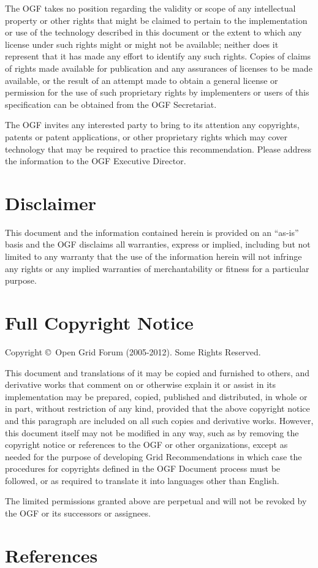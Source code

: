 \documentclass{article}
\newcommand{\copyrightyears}{2005-2012}
\begin{document}
The OGF takes no position regarding the validity or scope of any intellectual property or other rights that might be claimed to pertain to the implementation or use of the technology described in this document or the extent to which any license under such rights might or might not be available; neither does it represent that it has made any effort to identify any such rights.  Copies of claims of rights made available for publication and any assurances of licenses to be made available, or the result of an attempt made to obtain a general license or permission for the use of such proprietary rights by implementers or users of this specification can be obtained from the OGF Secretariat.

The OGF invites any interested party to bring to its attention any copyrights, patents or patent applications, or other proprietary rights which may cover technology that may be required to practice this recommendation.  Please address the information to the OGF Executive Director.

\section{Disclaimer}

This document and the information contained herein is provided on an \enquote{as-is} basis and the OGF disclaims all warranties, express or implied, including but not limited to any warranty that the use of the information herein will not infringe any rights or any implied warranties of merchantability or fitness for a particular purpose.

\section{Full Copyright Notice}

Copyright \copyright \ Open Grid Forum (\copyrightyears). Some Rights Reserved.

This document and translations of it may be copied and furnished to others, and derivative works that comment on or otherwise explain it or assist in its implementation may be prepared, copied, published and distributed, in whole or in part, without restriction of any kind, provided that the above copyright notice and this paragraph are included on all such copies and derivative works. However, this document itself may not be modified in any way, such as by removing the copyright notice or references to the OGF or other organizations, except as needed for the purpose of developing Grid Recommendations in which case the procedures for copyrights defined in the OGF Document process must be followed, or as required to translate it into languages other than English.

The limited permissions granted above are perpetual and will not be revoked by the OGF or its successors or assignees.

\section{References}
\renewcommand{\refname}{}
\vspace*{-3em}

\end{document}
